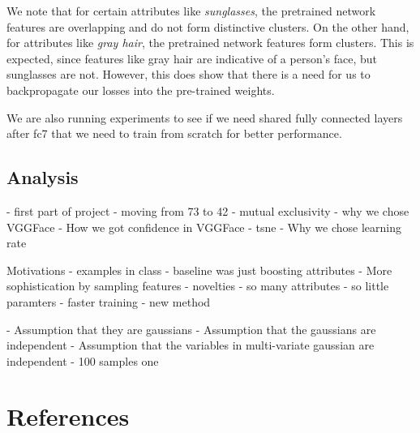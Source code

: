 \documentclass[twocolumn]{article}
\begin{document}
We note that for certain attributes like \emph{sunglasses}, the pretrained network features are overlapping and do not form distinctive clusters. On the other hand, for attributes like \emph{gray hair}, the pretrained network features form clusters. This is expected, since features like gray hair are indicative of a person's face, but sunglasses are not. However, this does show that there is a need for us to backpropagate our losses into the pre-trained weights.

We are also running experiments to see if we need shared fully connected layers after fc7 that we need to train from scratch for better performance.
\subsection{Analysis}

- first part of project
    - moving from 73 to 42 - mutual exclusivity
    - why we chose VGGFace
    - How we got confidence in VGGFace - tsne
    - Why we chose learning rate
    

Motivations
- examples in class
    - baseline was just boosting attributes
    - More sophistication by sampling features
- novelties
    - so many attributes
    - so little paramters
    - faster training
    - new method

- Assumption that they are gaussians
- Assumption that the gaussians are independent
- Assumption that the variables in multi-variate gaussian are independent
- 100 samples one

\section{References}
\printbibliography[heading=none]
\end{document}

